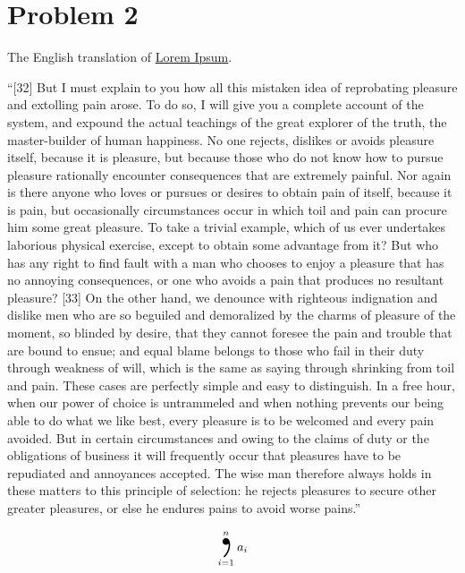 \documentclass[letterpaper]{article}
\begin{document}
\section*{Problem 2}
The English translation of \href{https://en.wikipedia.org/wiki/Lorem_ipsum#Source_text}{Lorem Ipsum}.
\begin{ddanger}
    ``[32] But I must explain to you how all this mistaken idea of reprobating pleasure and extolling pain arose.
    To do so, I will give you a complete account of the system, and expound the actual teachings of the great explorer of the truth, the master-builder of human happiness.
    No one rejects, dislikes or avoids pleasure itself, because it is pleasure, but because those who do not know how to pursue pleasure rationally encounter consequences that are extremely painful.
    Nor again is there anyone who loves or pursues or desires to obtain pain of itself, because it is pain, but occasionally circumstances occur in which toil and pain can procure him some great pleasure.
    To take a trivial example, which of us ever undertakes laborious physical exercise, except to obtain some advantage from it?
    But who has any right to find fault with a man who chooses to enjoy a pleasure that has no annoying consequences, or one who avoids a pain that produces no resultant pleasure?
    [33] On the other hand, we denounce with righteous indignation and dislike men who are so beguiled and demoralized by the charms of pleasure of the moment, so blinded by desire, that they cannot foresee the pain and trouble that are bound to ensue; and equal blame belongs to those who fail in their duty through weakness of will, which is the same as saying through shrinking from toil and pain.
    These cases are perfectly simple and easy to distinguish.
    In a free hour, when our power of choice is untrammeled and when nothing prevents our being able to do what we like best, every pleasure is to be welcomed and every pain avoided.
    But in certain circumstances and owing to the claims of duty or the obligations of business it will frequently occur that pleasures have to be repudiated and annoyances accepted.
    The wise man therefore always holds in these matters to this principle of selection: he rejects pleasures to secure other greater pleasures, or else he endures pains to avoid worse pains.''~\cite{book:lorem_ipsum}\hfill{}
\end{ddanger}

\[
  \bigcomma_{i=1}^n a_{i}
\]

\printbibliography
\end{document}
